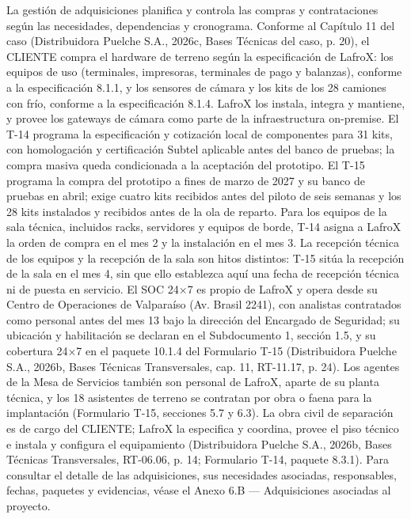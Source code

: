 La gestión de adquisiciones planifica y controla las compras y contrataciones según las necesidades, dependencias y cronograma. Conforme al Capítulo 11 del caso (Distribuidora Puelche S.A., 2026c, Bases Técnicas del caso, p. 20), el CLIENTE compra el hardware de terreno según la especificación de LafroX: los equipos de uso (terminales, impresoras, terminales de pago y balanzas), conforme a la especificación 8.1.1, y los sensores de cámara y los kits de los 28 camiones con frío, conforme a la especificación 8.1.4. LafroX los instala, integra y mantiene, y provee los gateways de cámara como parte de la infraestructura on-premise. El T-14 programa la especificación y cotización local de componentes para 31 kits, con homologación y certificación Subtel aplicable antes del banco de pruebas; la compra masiva queda condicionada a la aceptación del prototipo. El T-15 programa la compra del prototipo a fines de marzo de 2027 y su banco de pruebas en abril; exige cuatro kits recibidos antes del piloto de seis semanas y los 28 kits instalados y recibidos antes de la ola de reparto. Para los equipos de la sala técnica, incluidos racks, servidores y equipos de borde, T-14 asigna a LafroX la orden de compra en el mes 2 y la instalación en el mes 3. La recepción técnica de los equipos y la recepción de la sala son hitos distintos: T-15 sitúa la recepción de la sala en el mes 4, sin que ello establezca aquí una fecha de recepción técnica ni de puesta en servicio. El SOC 24×7 es propio de LafroX y opera desde su Centro de Operaciones de Valparaíso (Av. Brasil 2241), con analistas contratados como personal antes del mes 13 bajo la dirección del Encargado de Seguridad; su ubicación y habilitación se declaran en el Subdocumento 1, sección 1.5, y su cobertura 24×7 en el paquete 10.1.4 del Formulario T-15 (Distribuidora Puelche S.A., 2026b, Bases Técnicas Transversales, cap. 11, RT-11.17, p. 24). Los agentes de la Mesa de Servicios también son personal de LafroX, aparte de su planta técnica, y los 18 asistentes de terreno se contratan por obra o faena para la implantación (Formulario T-15, secciones 5.7 y 6.3). La obra civil de separación es de cargo del CLIENTE; LafroX la especifica y coordina, provee el piso técnico e instala y configura el equipamiento (Distribuidora Puelche S.A., 2026b, Bases Técnicas Transversales, RT-06.06, p. 14; Formulario T-14, paquete 8.3.1). Para consultar el detalle de las adquisiciones, sus necesidades asociadas, responsables, fechas, paquetes y evidencias, véase el Anexo 6.B --- Adquisiciones asociadas al proyecto.

